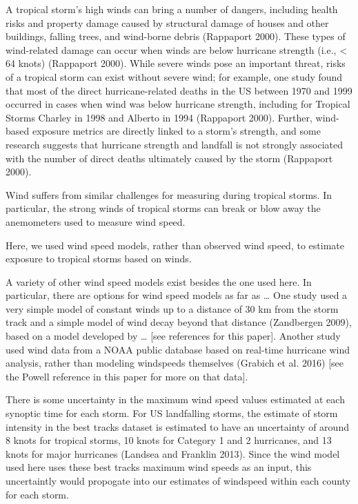 \documentclass[]{elsarticle} %
\begin{document}
A tropical storm's high winds can bring a number of dangers, including
health risks and property damage caused by structural damage of houses
and other buildings, falling trees, and wind-borne debris (Rappaport
2000). These types of wind-related damage can occur when winds are below
hurricane strength (i.e., \textless{} 64 knots) (Rappaport 2000). While
severe winds pose an important threat, risks of a tropical storm can
exist without severe wind; for example, one study found that most of the
direct hurricane-related deaths in the US between 1970 and 1999 occurred
in cases when wind was below hurricane strength, including for Tropical
Storms Charley in 1998 and Alberto in 1994 (Rappaport 2000). Further,
wind-based exposure metrics are directly linked to a storm's strength,
and some research suggests that hurricane strength and landfall is not
strongly associated with the number of direct deaths ultimately caused
by the storm (Rappaport 2000).

Wind suffers from similar challenges for measuring during tropical
storms. In particular, the strong winds of tropical storms can break or
blow away the anemometers used to measure wind speed.

Here, we used wind speed models, rather than observed wind speed, to
estimate exposure to tropical storms based on winds.

A variety of other wind speed models exist besides the one used here. In
particular, there are options for wind speed models as far as \ldots{}
One study used a very simple model of constant winds up to a distance of
30 km from the storm track and a simple model of wind decay beyond that
distance (Zandbergen 2009), based on a model developed by \ldots{}
{[}see references for this paper{]}. Another study used wind data from a
NOAA public database based on real-time hurricane wind analysis, rather
than modeling windspeeds themselves (Grabich et al. 2016) {[}see the
Powell reference in this paper for more on that data{]}.

There is some uncertainty in the maximum wind speed values estimated at
each synoptic time for each storm. For US landfalling storms, the
estimate of storm intensity in the best tracks dataset is estimated to
have an uncertainty of around 8 knots for tropical storms, 10 knots for
Category 1 and 2 hurricanes, and 13 knots for major hurricanes (Landsea
and Franklin 2013). Since the wind model used here uses these best
tracks maximum wind speeds as an input, this uncertaintly would
propogate into our estimates of windspeed within each county for each
storm.
\end{document}
